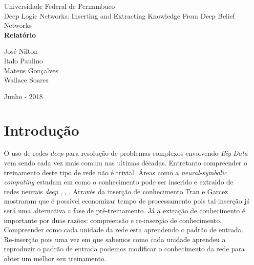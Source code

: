 \documentclass[a4paper, 12pt]{article}
\begin{document}
    \sloppy
    \begin{titlepage}
      \begin{center}
          \Huge{Universidade Federal de Pernambuco}\\
          \large{Deep Logic Networks: Inserting and Extracting
    Knowledge From Deep Belief Networks}\\ 
          \vspace{15pt}
          \vspace{95pt}
          \textbf{\LARGE{Relatório}}\\
          \vspace{3,5cm}
      \end{center}
    
      \begin{flushleft}
          \begin{tabbing}
                      José Nilton\\
                      Italo Paulino\\
                      Mateus Gonçalves\\ 
                      Wallace Soares\\
          \end{tabbing}
      \end{flushleft}
      \vspace{1cm}
    
      \begin{center}
          \vspace{\fill}
          Junho - 2018\\
      \end{center}
    \end{titlepage}
    \newpage
    \tableofcontents
    \thispagestyle{empty}
    \newpage
    \section{Introdução}
    O uso de redes \textit{deep} para resolução de problemas complexos envolvendo \textit{Big Data} vem sendo cada vez mais comum nas ultimas décadas. Entretanto compreender o treinamento deste tipo de rede não é trivial. Áreas como a \textit{neural-symbolic computing} estudam em como o conhecimento pode ser inserido e extraido de redes neurais \textit{deep} \cite{Tran}, \cite{garbook}, \cite{garConf}. Através da inserção de conhecimento Tran e Garcez \cite{Tran} mostraram que é possível economizar tempo de processamento pois tal inserção já será uma alternativa a fase de pré-treinamento.
    Já a extração de conhecimento é importante por duas razões: compreensão e re-inserção de conhecimento. Compreender como cada unidade da rede esta aprendendo o padrão de entrada. Re-inserção pois uma vez em que sabemos como cada unidade aprendeu a reproduzir o padrão de entrada podemos modificar o conhecimento da rede para obter um melhor seu treinamento.
    
\end{document}
